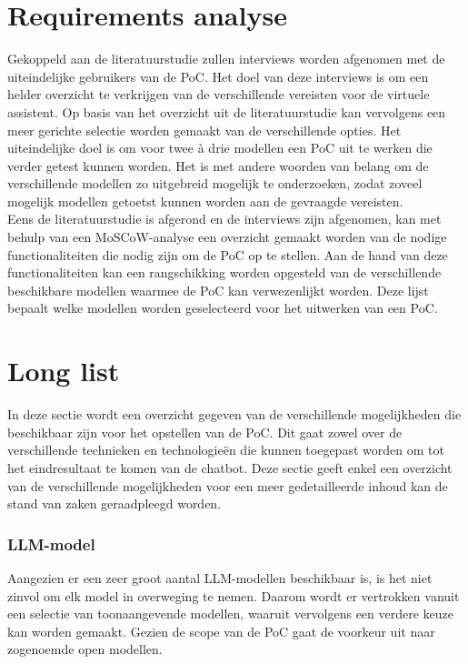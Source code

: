\section{Requirements analyse}


Gekoppeld aan de literatuurstudie zullen interviews worden afgenomen met de uiteindelijke gebruikers van de PoC. Het doel van deze interviews is om een helder overzicht te verkrijgen van de verschillende vereisten voor de virtuele assistent. Op basis van het overzicht uit de literatuurstudie kan vervolgens een meer gerichte selectie worden gemaakt van de verschillende opties. Het uiteindelijke doel is om voor twee à drie modellen een PoC uit te werken die verder getest kunnen worden. Het is met andere woorden van belang om de verschillende modellen zo uitgebreid mogelijk te onderzoeken, zodat zoveel mogelijk modellen getoetst kunnen worden aan de gevraagde vereisten. 
\\[1em]
Eens de literatuurstudie is afgerond en de interviews zijn afgenomen, kan met behulp van een MoSCoW-analyse een overzicht gemaakt worden van de nodige functionaliteiten die nodig zijn om de PoC op te stellen. Aan de hand van deze functionaliteiten kan een rangschikking worden opgesteld van de verschillende beschikbare modellen waarmee de PoC kan verwezenlijkt worden. Deze lijst bepaalt welke modellen worden geselecteerd voor het uitwerken van een PoC.

\section{Long list}

In deze sectie wordt een overzicht gegeven van de verschillende mogelijkheden die beschikbaar zijn voor het opstellen van de PoC. Dit gaat zowel over de verschillende technieken en technologieën die kunnen toegepast worden om tot het eindresultaat te komen van de chatbot. Deze sectie geeft enkel een overzicht van de verschillende mogelijkheden voor een meer gedetailleerde inhoud kan de stand van zaken geraadpleegd worden.

\subsubsection{LLM-model}

Aangezien er een zeer groot aantal LLM-modellen beschikbaar is, is het niet zinvol om elk model in overweging te nemen. Daarom wordt er vertrokken vanuit een selectie van toonaangevende modellen, waaruit vervolgens een verdere keuze kan worden gemaakt. Gezien de scope van de PoC gaat de voorkeur uit naar zogenoemde open modellen.

